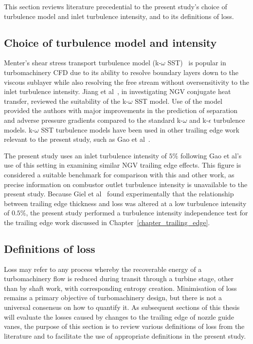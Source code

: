 \documentclass[a4paper, 11pt, oneside]{report}
\begin{document}
This section reviews literature precedential to the present study's choice of turbulence model and inlet turbulence intensity, and to its definitions of loss.

\subsection{Choice of turbulence model and intensity}

Menter's shear stress transport turbulence model (k-$\omega$ SST)~\cite{menter_turbulence_models} is popular in turbomachinery CFD due to its ability to resolve boundary layers down to the viscous sublayer while also resolving the free stream without oversensitivity to the inlet turbulence intensity. Jiang et al~\cite{jiang_heat_transfer}, in investigating NGV conjugate heat transfer, reviewed the suitability of the k-$\omega$ SST model. Use of the model provided the authors with major improvements in the prediction of separation and adverse pressure gradients compared to the standard k-$\omega$ and k-$\epsilon$ turbulence models. k-$\omega$ SST turbulence models have been used in other trailing edge work relevant to the present study, such as Gao et al~\cite{gao_te}. 

The present study uses an inlet turbulence intensity of $5\%$ following Gao et al's~\cite{gao_te} use of this setting in examining similar NGV trailing edge effects. This figure is considered a suitable benchmark for comparison with this and other work, as precise information on combustor outlet turbulence intensity is unavailable to the present study. Because Giel et al~\cite{giel_te_thickness} found experimentally that the relationship between trailing edge thickness and loss was altered at a low turbulence intensity of $0.5\%$, the present study performed a turbulence intensity independence test for the trailing edge work discussed in Chapter~\ref{chapter_trailing_edge}.

\subsection{Definitions of loss}

Loss may refer to any process whereby the recoverable energy of a turbomachinery flow is reduced during transit through a turbine stage, other than by shaft work, with corresponding entropy creation. Minimisation of loss remains a primary objective of turbomachinery design, but there is not a universal consensus on how to quantify it. As subsequent sections of this thesis will evaluate the losses caused by changes to the trailing edge of nozzle guide vanes, the purpose of this section is to review various definitions of loss from the literature and to facilitate the use of appropriate definitions in the present study.
\end{document}
